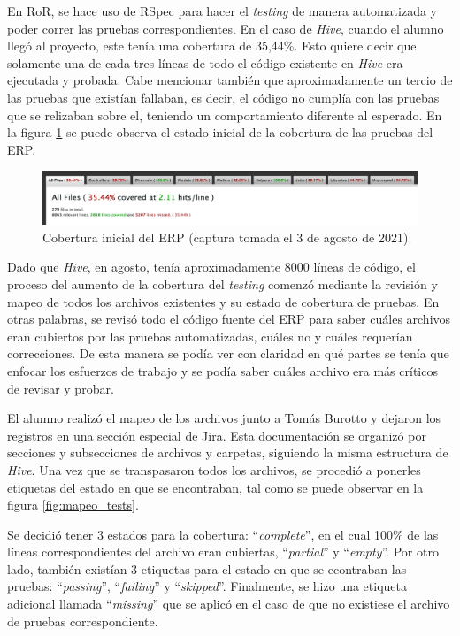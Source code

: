   En RoR, se hace uso de RSpec para hacer el \textit{testing} de manera automatizada y poder correr las pruebas correspondientes. En el caso de \textit{Hive}, cuando el alumno llegó al proyecto, este tenía una cobertura de 35,44\%. Esto quiere decir que solamente una de cada tres líneas de todo el código existente en \textit{Hive} era ejecutada y probada. Cabe mencionar también que aproximadamente un tercio de las pruebas que existían fallaban, es decir, el código no cumplía con las pruebas que se relizaban sobre el, teniendo un comportamiento diferente al esperado. En la figura \ref{fig:testing_original} se puede observa el estado inicial de la cobertura de las pruebas del ERP.

  \begin{figure}[H]
    \centering
    \includegraphics[width=\linewidth]{figures/testing/testing_original.png}
    \caption{Cobertura inicial del ERP (captura tomada el 3 de agosto de 2021).}
    \label{fig:testing_original}
  \end{figure}

  Dado que \textit{Hive}, en agosto, tenía aproximadamente 8000 líneas de código, el proceso del aumento de la cobertura del \textit{testing} comenzó mediante la revisión y mapeo de todos los archivos existentes y su estado de cobertura de pruebas. En otras palabras, se revisó todo el código fuente del ERP para saber cuáles archivos eran cubiertos por las pruebas automatizadas, cuáles no y cuáles requerían correcciones. De esta manera se podía ver con claridad en qué partes se tenía que enfocar los esfuerzos de trabajo y se podía saber cuáles archivo era más críticos de revisar y probar.

  El alumno realizó el mapeo de los archivos junto a Tomás Burotto y dejaron los registros en una sección especial de Jira. Esta documentación se organizó por secciones y subsecciones de archivos y carpetas, siguiendo la misma estructura de \textit{Hive}. Una vez que se transpasaron todos los archivos, se procedió a ponerles etiquetas del estado en que se encontraban, tal como se puede observar en la figura \ref{fig:mapeo_tests}.
  
  Se decidió tener 3 estados para la cobertura: ``\textit{complete}'', en el cual 100\% de las líneas correspondientes del archivo eran cubiertas, ``\textit{partial}'' y ``\textit{empty}''. Por otro lado, también existían 3 etiquetas para el estado en que se econtraban las pruebas: ``\textit{passing}'', ``\textit{failing}'' y ``\textit{skipped}''. Finalmente, se hizo una etiqueta adicional llamada ``\textit{missing}'' que se aplicó en el caso de que no existiese el archivo de pruebas correspondiente.
  

